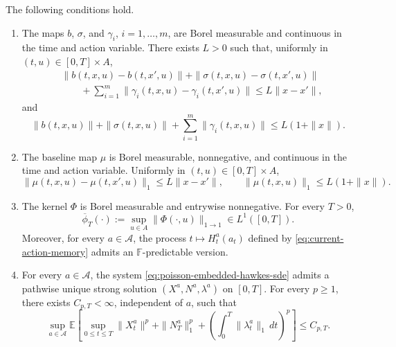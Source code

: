 \documentclass[10pt,a4paper]{amsart}
\begin{document}
\begin{assumption}
\label{ass:standing}
The following conditions hold.
\begin{enumerate}

    \item[(S1)] The maps $b$, $\sigma$, and $\gamma_i$, $i=1,\ldots,m$, are
    Borel measurable and continuous in the time and action variable. There exists
    $L>0$ such that, uniformly in $(t,u)\in[0,T]\times A$,
    \[
    \begin{aligned}
    &\|b(t,x,u)-b(t,x',u)\|
    +\|\sigma(t,x,u)-\sigma(t,x',u)\|
    \\
    &\qquad
    +\sum_{i=1}^m
    \|\gamma_i(t,x,u)-\gamma_i(t,x',u)\|
    \leq L\|x-x'\|,
    \end{aligned}
    \]
    and
    \[
    \|b(t,x,u)\|+\|\sigma(t,x,u)\|
    +\sum_{i=1}^m\|\gamma_i(t,x,u)\|
    \leq L(1+\|x\|).
    \]

    \item[(S2)] The baseline map $\mu$ is Borel measurable, nonnegative, and
    continuous in the time and action variable. Uniformly in
    $(t,u)\in[0,T]\times A$,
    \[
    \|\mu(t,x,u)-\mu(t,x',u)\|_1
    \leq L\|x-x'\|,
    \qquad
    \|\mu(t,x,u)\|_1\leq L(1+\|x\|).
    \]
    \item[(S3)] The kernel $\Phi$ is Borel measurable and entrywise
    nonnegative. For every $T>0$,
    \[
    \overline\phi_T(\cdot)
    :=
    \sup_{u\in A}\|\Phi(\cdot,u)\|_{1\to1}
    \in L^1([0,T]).
    \]
    Moreover, for every $a\in\mathcal A$, the process
    $t\mapsto H_t^a(a_t)$ defined by \eqref{eq:current-action-memory} admits an
    $\mathbb F$-predictable version.

    \item[(S4)] For every $a\in\mathcal A$, the system
    \eqref{eq:poisson-embedded-hawkes-sde} admits a pathwise unique strong solution $(X^a,N^a,\lambda^a)$ on $[0,T]$.
    For every $p\geq1$, there exists $C_{p,T}<\infty$, independent of
    $a$, such that
    \[
    \sup_{a\in\mathcal A}
    \mathbb E\!\left[
       \sup_{0\leq t\leq T}\|X_t^a\|^p
       +\|N_T^a\|_1^p
       +\left(\int_0^T\|\lambda_t^a\|_1\,dt\right)^p
    \right]
    \leq C_{p,T}.
    \]
    \end{enumerate}
\end{assumption}
\end{document}
